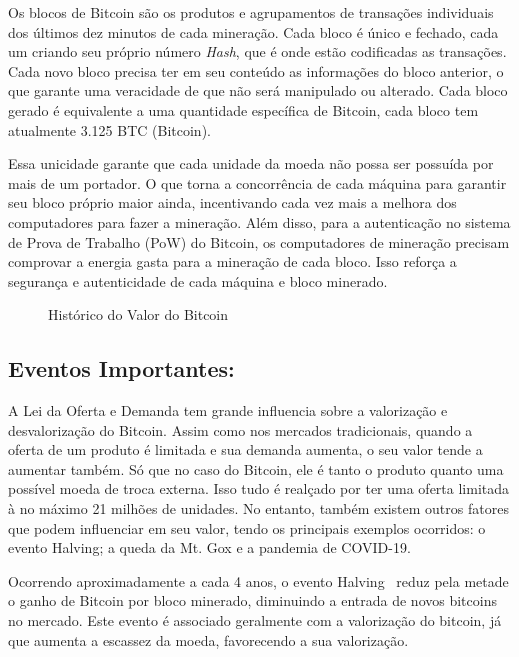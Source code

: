 Os blocos de Bitcoin são os produtos e agrupamentos de transações individuais dos últimos dez minutos de cada mineração. Cada bloco é único e fechado, cada um criando seu próprio número \textit{Hash}, que é onde estão codificadas as transações. Cada novo bloco precisa ter em seu conteúdo as informações do bloco anterior, o que garante uma veracidade de que não será manipulado ou alterado. Cada bloco gerado é equivalente a uma quantidade específica de Bitcoin, cada bloco tem atualmente 3.125 BTC (Bitcoin).

Essa unicidade garante que cada unidade da moeda não possa ser possuída por mais de um portador. O que torna a concorrência de cada máquina para garantir seu bloco próprio maior ainda, incentivando cada vez mais a melhora dos computadores para fazer a mineração. Além disso, para a autenticação no sistema de Prova de Trabalho (PoW) do Bitcoin, os computadores de mineração precisam comprovar a energia gasta para a mineração de cada bloco. Isso reforça a segurança e autenticidade de cada máquina e bloco minerado.

\begin{figure}
    \centering
    \caption{Histórico do Valor do Bitcoin}
    \label{fig:Candle Graph}
\end{figure}

\subsection{\textbf{Eventos Importantes:}}

A Lei da Oferta e Demanda tem grande influencia sobre a valorização e  desvalorização do Bitcoin.  Assim como nos mercados tradicionais, quando a oferta de um produto é limitada e sua demanda aumenta, o seu valor tende a aumentar também. Só que no caso do Bitcoin, ele é tanto o produto quanto uma possível moeda de troca externa. Isso tudo é realçado por ter uma oferta limitada à no máximo 21 milhões de unidades. No entanto, também existem outros fatores que podem influenciar  em seu valor, tendo os principais exemplos ocorridos: o evento Halving; a queda da Mt. Gox e a pandemia de COVID-19.

Ocorrendo aproximadamente a cada 4 anos, o evento Halving  reduz pela metade o ganho de Bitcoin por bloco minerado, diminuindo a entrada de novos bitcoins no mercado. Este evento é associado geralmente com a valorização do bitcoin, já que aumenta a escassez da moeda, favorecendo a sua valorização.

